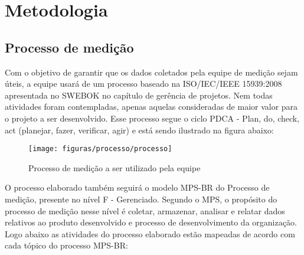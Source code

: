 \chapter{Metodologia}

\section{Processo de medição}

Com o objetivo de garantir que os dados coletados pela equipe de medição sejam úteis, a equipe usará de um processo baseado na ISO/IEC/IEEE 15939:2008 apresentada no SWEBOK no capítulo de gerência de projetos. Nem todas atividades foram contempladas, apenas aquelas consideradas de maior valor para o projeto a ser desenvolvido. Esse processo segue o ciclo PDCA - Plan, do, check, act (planejar, fazer, verificar, agir) e está sendo ilustrado na figura abaixo:

\begin{figure}[!htpb]
\centering
\texttt{[image: figuras/processo/processo]}
\caption{Processo de medição a ser utilizado pela equipe}
\end{figure}


O processo elaborado também seguirá o modelo MPS-BR do Processo de medição, presente no nível F - Gerenciado. Segundo o MPS, o propósito do processo de medição nesse nível é coletar, armazenar, analisar e relatar dados relativos ao produto desenvolvido e processo de desenvolvimento da organização. Logo abaixo as atividades do processo elaborado estão mapeadas de acordo com cada tópico do processo MPS-BR:

